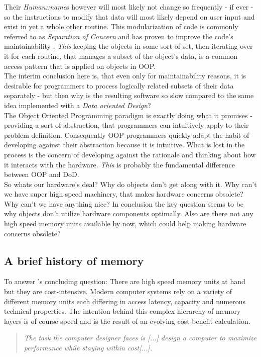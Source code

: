 Their \textit{Human::name}s however will most likely not change so frequently - if ever - so the instructions to modify that data will most likely depend on user input and exist in yet a whole other routine. This modularization of code is commonly referred to as \textit{Separation of Concern} and has proven to improve the code's maintainability .
\textit{This} keeping the objects in some sort of set, then iterating over it for each routine, that manages a subset of the object's data, is a common access pattern that is applied on objects in OOP.\\
The interim conclusion here is, that even only for maintainability reasons, it is desirable for programmers to process logically related subsets of their data separately - but then why is the resulting software so slow compared to the same idea implemented with a \textit{Data oriented Design}?\\
The Object Oriented Programming paradigm is exactly doing what it promises - providing a sort of abstraction, that programmers can intuitively apply to their problem definition. Consequently OOP programmers quickly adapt the habit of developing against their abstraction because it is intuitive. What is lost in the process is the concern of developing against the rationale and thinking about how it interacts with the hardware. \textit{This} is probably the fundamental difference between OOP and DoD.\\
So whats our hardware's deal? Why do objects don't get along with it. Why can't we have super high speed machinery, that makes hardware concerns obsolete? Why can't we have anything nice?
In conclusion the key question seems to be why objects don't utilize hardware components  optimally. Also are there not any high speed memory units available by now, which could help making hardware concerns obsolete?

\subsection{A brief history of memory}
To answer 's concluding question: There are high speed memory units at hand but they are cost-intensive. Modern computer systems rely on a variety of different memory units each differing in access latency, capacity and numerous technical properties. The intention behind this complex hierarchy of memory layers is of course speed and is the result of an evolving cost-benefit calculation.
\begin{quote}
	\textit{The task the computer designer faces is [...] design a computer to maximize
		performance while staying within cost[...].} 
\end{quote}

